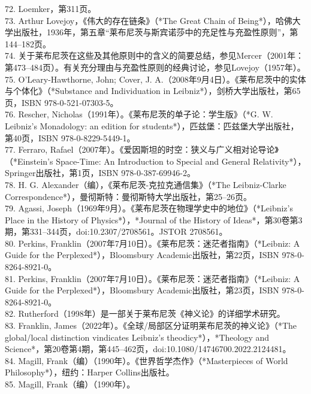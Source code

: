 72. Loemker，第311页。\\
73. Arthur Lovejoy，《伟大的存在链条》（*The Great Chain of Being*），哈佛大学出版社，1936年，第五章“莱布尼茨与斯宾诺莎中的充足性与充盈性原则”，第144–182页。\\
74. 关于莱布尼茨在这些及其他原则中的含义的简要总结，参见Mercer（2001年：第473–484页）。有关充分理由与充盈性原则的经典讨论，参见Lovejoy（1957年）。\\
75. O'Leary-Hawthorne, John; Cover, J. A.（2008年9月4日）。《莱布尼茨中的实体与个体化》（*Substance and Individuation in Leibniz*），剑桥大学出版社，第65页，ISBN 978-0-521-07303-5。\\ 
76. Rescher, Nicholas（1991年）。《莱布尼茨的单子论：学生版》（*G. W. Leibniz's Monadology: an edition for students*），匹兹堡：匹兹堡大学出版社，第40页，ISBN 978-0-8229-5449-1。\\
77. Ferraro, Rafael（2007年）。《爱因斯坦的时空：狭义与广义相对论导论》（*Einstein’s Space-Time: An Introduction to Special and General Relativity*），Springer出版社，第1页，ISBN 978-0-387-69946-2。\\
78. H. G. Alexander（编），《莱布尼茨-克拉克通信集》（*The Leibniz-Clarke Correspondence*），曼彻斯特：曼彻斯特大学出版社，第25–26页。\\
79. Agassi, Joseph（1969年9月）。《莱布尼茨在物理学史中的地位》（*Leibniz's Place in the History of Physics*），*Journal of the History of Ideas*，第30卷第3期，第331–344页，doi:10.2307/2708561。JSTOR 2708561。\\
80. Perkins, Franklin（2007年7月10日）。《莱布尼茨：迷茫者指南》（*Leibniz: A Guide for the Perplexed*），Bloomsbury Academic出版社，第22页，ISBN 978-0-8264-8921-0。\\  
81. Perkins, Franklin（2007年7月10日）。《莱布尼茨：迷茫者指南》（*Leibniz: A Guide for the Perplexed*），Bloomsbury Academic出版社，第23页，ISBN 978-0-8264-8921-0。\\  
82. Rutherford（1998年）是一部关于莱布尼茨《神义论》的详细学术研究。\\
83. Franklin, James（2022年）。《全球/局部区分证明莱布尼茨的神义论》（*The global/local distinction vindicates Leibniz’s theodicy*），*Theology and Science*，第20卷第4期，第445–462页，doi:10.1080/14746700.2022.2124481。\\
84. Magill, Frank（编）（1990年）。《世界哲学杰作》（*Masterpieces of World Philosophy*），纽约：Harper Collins出版社。\\  
85. Magill, Frank（编）（1990年）。\\

